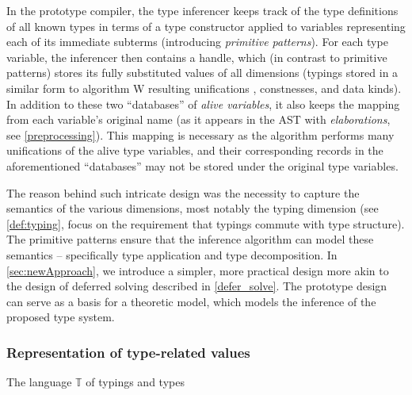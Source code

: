 In the prototype compiler, the type inferencer keeps track of the type definitions of all known types in terms of a type constructor applied to variables representing each of its immediate subterms (introducing \emph{primitive patterns}). For each type variable, the inferencer then contains a handle, which (in contrast to primitive patterns) stores its fully substituted values of all dimensions (typings stored in a similar form to algorithm W resulting unifications \cite{damas1982principal}, constnesses, and data kinds). In addition to these two ``databases'' of \emph{alive variables}, it also keeps the mapping from each variable's original name (as it appears in the AST with \emph{elaborations}, see \cref{preprocessing}). This mapping is necessary as the algorithm performs many unifications of the alive type variables, and their corresponding records in the aforementioned ``databases'' may not be stored under the original type variables.

The reason behind such intricate design was the necessity to capture the semantics of the various dimensions, most notably the typing dimension (see \cref{def:typing}, focus on the requirement that typings commute with type structure). The primitive patterns ensure that the inference algorithm can model these semantics -- specifically type application and type decomposition. In \cref{sec:newApproach}, we introduce a simpler, more practical design more akin to the design of deferred solving described in \cref{defer_solve}. The prototype design can serve as a basis for a theoretic model, which models the inference of the proposed type system.

\subsubsection{Representation of type-related values}
\label{sec:repre}

\begin{lang}
  \def\grammarP{0.6}
  \begin{grammar}
  \end{grammar}
  \caption{The language $\mathbb{T}$ of typings and types}
  \label{lang:typing}
\end{lang}


